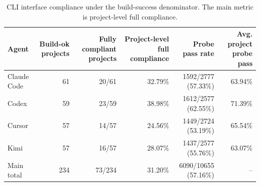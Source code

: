 \begin{table}[t]
\centering
\small
\caption{CLI interface compliance under the build-success denominator. The main metric is project-level full compliance.}
\label{tab:cli-interface-compliance}
\begin{tabular}{lrrrrr}
\toprule
Agent & Build-ok projects & Fully compliant projects & Project-level full compliance & Probe pass rate & Avg. project probe pass \\
\midrule
Claude Code & 61 & 20/61 & 32.79\% & 1592/2777 (57.33\%) & 63.94\% \\
Codex & 59 & 23/59 & 38.98\% & 1612/2577 (62.55\%) & 71.39\% \\
Cursor & 57 & 14/57 & 24.56\% & 1449/2724 (53.19\%) & 65.54\% \\
Kimi & 57 & 16/57 & 28.07\% & 1437/2577 (55.76\%) & 63.07\% \\
Main total & 234 & 73/234 & 31.20\% & 6090/10655 (57.16\%) & -- \\
\bottomrule
\end{tabular}
\end{table}
